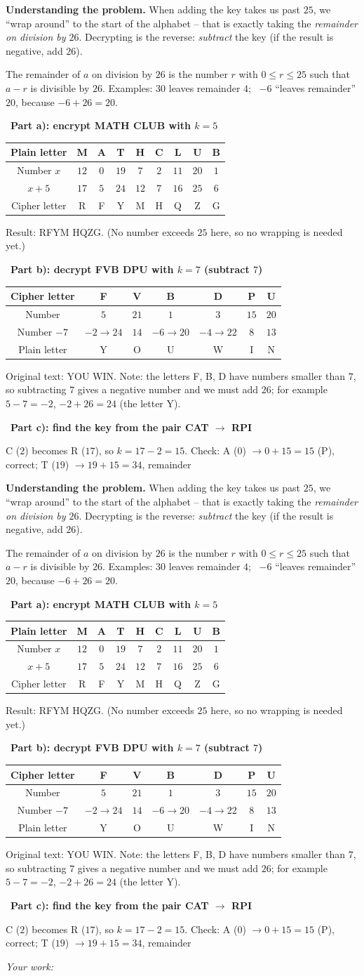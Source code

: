 \documentclass[11pt]{article}
\newif\ifsol \soltrue
\newcommand{\StuProb}[2]{\begin{probboxS}{#1}{#2}\StuProbBody\end{probboxS}}
\newcommand{\probsol}[1]{%
  \begin{lrbox}{\solmeasure}\begin{minipage}{\dimexpr\linewidth-24pt\relax}#1\end{minipage}\end{lrbox}%
  \ifsol
    \begin{solbox}#1\end{solbox}%
  \else
    \setlength{\solht}{\dimexpr\ht\solmeasure+\dp\solmeasure+0.85cm\relax}%
    \ifdim\solht<1.35cm\setlength{\solht}{1.35cm}\fi
    \ifdim\solht>\StudentMaxWork\setlength{\solht}{\StudentMaxWork}\fi
    \par\noindent\begin{minipage}{\linewidth}%
    \expandafter\StuProb\StuProbArgs
    \begin{tcolorbox}[colback=white,colframe=Line,boxrule=0.8pt,arc=5pt,
      left=8pt,right=8pt,top=4pt,bottom=4pt,height=\solht]{\footnotesize\color{Slate}\itshape\WorkWord}\end{tcolorbox}%
    \end{minipage}\par\medskip
  \fi}
\newlength{\StudentMaxWork}\setlength{\StudentMaxWork}{4.5cm}
\newcommand{\step}[2]{\par\smallskip\noindent{\bfseries\color{tmBlue!85!black}\StepWord~#1.}\ {\bfseries #2}\par\nopagebreak}
\def\WorkWord{Your work:}
\def\StepWord{Step}
\begin{document}
\probsol{
\textbf{Understanding the problem.} When adding the key takes us past $25$, we ``wrap around'' to the start of the alphabet -- that is
exactly taking the \emph{remainder on division by $26$}. Decrypting is the reverse: \emph{subtract} the key (if the result is
negative, add $26$).
\begin{recallbox}The remainder of $a$ on division by $26$ is the number $r$ with $0 \le r \le 25$ such that $a - r$ is divisible by
$26$. Examples: $30$ leaves remainder $4$; \ $-6$ ``leaves remainder'' $20$, because $-6 + 26 = 20$.\end{recallbox}
\step{1}{Part a): encrypt \textsf{MATH CLUB} with $k = 5$}
\begin{center}\small
\begin{tabular}{|c|c|c|c|c|c|c|c|c|}
\hline
\rowcolor{tmBlue!10} Plain letter & M & A & T & H & C & L & U & B\\ \hline
Number $x$ & $12$ & $0$ & $19$ & $7$ & $2$ & $11$ & $20$ & $1$\\ \hline
$x + 5$ & $17$ & $5$ & $24$ & $12$ & $7$ & $16$ & $25$ & $6$\\ \hline
Cipher letter & R & F & Y & M & H & Q & Z & G\\ \hline
\end{tabular}
\end{center}
Result: \textsf{RFYM HQZG}. (No number exceeds $25$ here, so no wrapping is needed yet.)
\step{2}{Part b): decrypt \textsf{FVB DPU} with $k = 7$ (subtract $7$)}
\begin{center}\small
\begin{tabular}{|c|c|c|c|c|c|c|}
\hline
\rowcolor{tmBlue!10} Cipher letter & F & V & B & D & P & U\\ \hline
Number & $5$ & $21$ & $1$ & $3$ & $15$ & $20$\\ \hline
Number $- 7$ & $-2 \to 24$ & $14$ & $-6 \to 20$ & $-4 \to 22$ & $8$ & $13$\\ \hline
Plain letter & Y & O & U & W & I & N\\ \hline
\end{tabular}
\end{center}
Original text: \textsf{YOU WIN}. Note: the letters F, B, D have numbers smaller than $7$, so subtracting $7$ gives a negative number
and we must add $26$; for example $5 - 7 = -2$, $-2 + 26 = 24$ (the letter Y).
\step{3}{Part c): find the key from the pair \textsf{CAT} $\to$ \textsf{RPI}}
C ($2$) becomes R ($17$), so $k = 17 - 2 = 15$. Check: A ($0$) $\to 0 + 15 = 15$ (P), correct; T ($19$) $\to 19 + 15 = 34$, remainder
}
\end{document}
